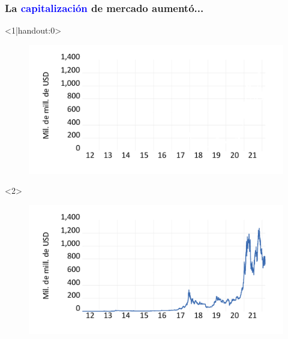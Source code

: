 \begin{frame}
\frametitle<1,2>{La \textcolor{blue}{capitalización} de mercado aumentó...}

        \begin{onlyenv}<1|handout:0>
        \begin{figure}[H]
        \begin{center}
         \includegraphics[width=1\textwidth]{images/C1/cap_axis.pdf}
         \end{center}
        \end{figure}
        \end{onlyenv}

        \begin{onlyenv}<2>
        \begin{figure}[H]
        \begin{center}
         \includegraphics[width=1\textwidth]{images/C1/cap.pdf}
         \end{center}
        \end{figure}
        \end{onlyenv}
        

\end{frame}
